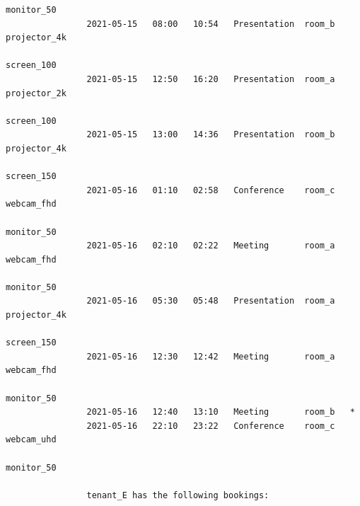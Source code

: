 \documentclass{article}
\begin{document}
\begin{Verbatim}[gobble=8]
                                                                    monitor_50
                2021-05-15   08:00   10:54   Presentation  room_b   projector_4k
                                                                    screen_100
                2021-05-15   12:50   16:20   Presentation  room_a   projector_2k
                                                                    screen_100
                2021-05-15   13:00   14:36   Presentation  room_b   projector_4k
                                                                    screen_150
                2021-05-16   01:10   02:58   Conference    room_c   webcam_fhd
                                                                    monitor_50
                2021-05-16   02:10   02:22   Meeting       room_a   webcam_fhd
                                                                    monitor_50
                2021-05-16   05:30   05:48   Presentation  room_a   projector_4k
                                                                    screen_150
                2021-05-16   12:30   12:42   Meeting       room_a   webcam_fhd
                                                                    monitor_50
                2021-05-16   12:40   13:10   Meeting       room_b   *
                2021-05-16   22:10   23:22   Conference    room_c   webcam_uhd
                                                                    monitor_50
                
                tenant_E has the following bookings:
                

\end{Verbatim}
\end{document}
